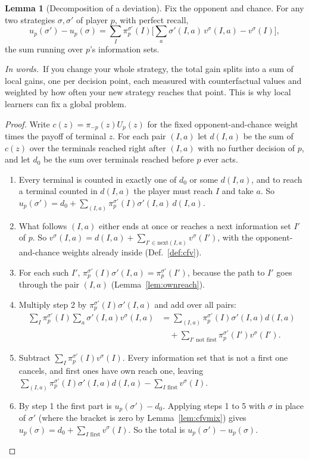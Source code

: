 \documentclass[11pt]{article}
\theoremstyle{definition}
\newtheorem{lemma}[definition]{Lemma}
\newcommand{\inwords}{\par\smallskip\noindent\textit{In words.}\ }
\newcommand{\Def}[1]{Def.~\ref{#1}}\newcommand{\Lem}[1]{Lemma~\ref{#1}}\newcommand{\Thm}[1]{Thm.~\ref{#1}}
\begin{document}
\begin{lemma}[Decomposition of a deviation]\label{lem:decomp}
Fix the opponent and chance. For any two strategies $\sigma,\sigma'$ of player $p$, with perfect recall,
\[ u_p(\sigma')-u_p(\sigma)=\sum_I\pi_p^{\sigma'}(I)\Big[\sum_a\sigma'(I,a)\,v^\sigma(I,a)-v^\sigma(I)\Big], \]
the sum running over $p$'s information sets.
\inwords If you change your whole strategy, the total gain splits into a sum of local gains, one per decision point,
each measured with counterfactual values and weighted by how often your new strategy reaches that point. This is why
local learners can fix a global problem.
\end{lemma}
\begin{proof}
Write $c(z)=\pi_{-p}(z)U_p(z)$ for the fixed opponent-and-chance weight times the payoff of terminal $z$. For each pair
$(I,a)$ let $d(I,a)$ be the sum of $c(z)$ over the terminals reached right after $(I,a)$ with no further decision of $p$,
and let $d_0$ be the sum over terminals reached before $p$ ever acts.
\begin{enumerate}[nosep]
\item Every terminal is counted in exactly one of $d_0$ or some $d(I,a)$, and to reach a terminal counted in $d(I,a)$ the
player must reach $I$ and take $a$. So $u_p(\sigma')=d_0+\sum_{(I,a)}\pi_p^{\sigma'}(I)\sigma'(I,a)\,d(I,a)$.
\item What follows $(I,a)$ either ends at once or reaches a next information set $I'$ of $p$. So
$v^\sigma(I,a)=d(I,a)+\sum_{I'\in\mathrm{next}(I,a)}v^\sigma(I')$, with the opponent-and-chance weights already inside
(\Def{def:cfv}).
\item For each such $I'$, $\pi_p^{\sigma'}(I)\sigma'(I,a)=\pi_p^{\sigma'}(I')$, because the path to $I'$ goes through the pair
$(I,a)$ (\Lem{lem:ownreach}).
\item Multiply step 2 by $\pi_p^{\sigma'}(I)\sigma'(I,a)$ and add over all pairs:
\begin{align*}\textstyle\sum_I\pi_p^{\sigma'}(I)\sum_a\sigma'(I,a)v^\sigma(I,a)&=\textstyle\sum_{(I,a)}\pi_p^{\sigma'}(I)\sigma'(I,a)d(I,a)\\&\quad+\textstyle\sum_{I'\text{ not first}}\pi_p^{\sigma'}(I')v^\sigma(I').\end{align*}
\item Subtract $\sum_I\pi_p^{\sigma'}(I)v^\sigma(I)$. Every information set that is not a first one cancels, and first ones
have own reach one, leaving $\sum_{(I,a)}\pi_p^{\sigma'}(I)\sigma'(I,a)d(I,a)-\sum_{I\text{ first}}v^\sigma(I)$.
\item By step 1 the first part is $u_p(\sigma')-d_0$. Applying steps 1 to 5 with $\sigma$ in place of $\sigma'$ (where the bracket
is zero by \Lem{lem:cfvmix}) gives $u_p(\sigma)=d_0+\sum_{I\text{ first}}v^\sigma(I)$. So the total is $u_p(\sigma')-u_p(\sigma)$.\qedhere
\end{enumerate}
\end{proof}
\end{document}
